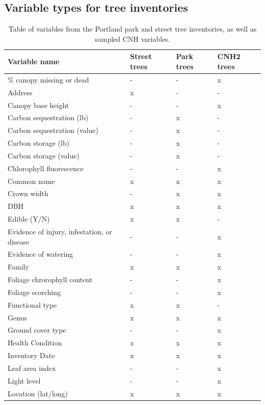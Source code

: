 \documentclass[12pt,twoside]{reedthesis}
\begin{document}
\hypertarget{variable-types-for-tree-inventories}{%
\subsection*{Variable types for tree inventories}\label{variable-types-for-tree-inventories}}
\begin{longtable}[t]{llll}
\caption[Table of variables from tree inventory data]{\label{tab:var-type-table}Table of variables from the Portland park and street tree inventories, as well as sampled CNH variables.}\\
\toprule
Variable name & Street trees & Park trees & CNH2 trees\\
\midrule
\% canopy missing or dead & - & - & x\\
Address & x & - & -\\
Canopy base height & - & - & x\\
Carbon sequestration (lb) & - & x & -\\
Carbon sequestration (value) & - & x & -\\
\addlinespace
Carbon storage (lb) & - & x & -\\
Carbon storage (value) & - & x & -\\
Chlorophyll fluorescence & - & - & x\\
Common name & x & x & x\\
Crown width & - & x & x\\
\addlinespace
DBH & x & x & x\\
Edible (Y/N) & x & x & -\\
Evidence of injury, infestation, or disease & - & - & x\\
Evidence of watering & - & - & x\\
Family & x & x & x\\
\addlinespace
Foliage chrorophyll content & - & - & x\\
Foliage scorching & - & - & x\\
Functional type & x & x & -\\
Genus & x & x & x\\
Ground cover type & - & - & x\\
\addlinespace
Health Condition & x & x & x\\
Inventory Date & x & x & x\\
Leaf area index & - & - & x\\
Light level & - & - & x\\
Location (lat/long) & x & x & x\\

\end{longtable}
\end{document}
